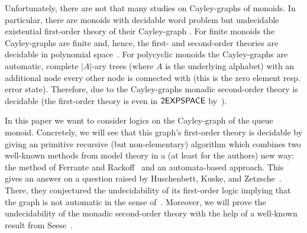 Unfortunately, there are not that many studies on Cayley-graphs of monoids. In particular, there are monoids with decidable word problem but undecidable existential first-order theory of their Cayley-graph \cite{NarO90,KusL06}. For finite monoids the Cayley-graphs are finite and, hence, the first- and second-order theories are decidable in polynomial space~\cite{Graedel03}. For polycyclic monoids the Cayley-graphs are automatic, complete $|A|$-ary trees (where $A$ is the underlying alphabet) with an additional node every other node is connected with (this is the zero element resp. error state). Therefore, due to \cite{DelKT03,KusL06} the Cayley-graphs monadic second-order theory is decidable (the first-order theory is even in $\mathsf{2EXPSPACE}$ by~\cite{KusL11}).

In this paper we want to consider logics on the Cayley-graph of the queue monoid. Concretely, we will see that this graph's first-order theory is decidable by giving an primitive recursive (but non-elementary) algorithm which combines two well-known methods from model theory in a (at least for the authors) new way: the method of Ferrante and Rackoff~\cite{FerR79} and an automata-based approach. This gives an answer on a question raised by Huschenbett, Kuske, and Zetzsche~\cite{HusKZ17}. There, they conjectured the undecidability of its first-order logic implying that the graph is not automatic in the sense of~\cite{KN95}. Moreover, we will prove the undecidability of the monadic second-order theory with the help of a well-known result from Seese~\cite{See91}.